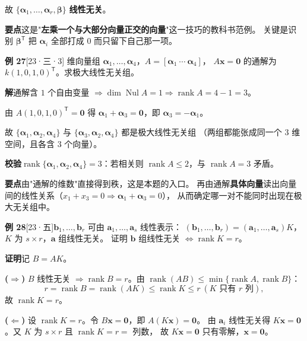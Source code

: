 \documentclass[10pt]{ctexart}
\newcommand{\rank}{\operatorname{rank}}
\newcommand{\Nul}{\operatorname{Nul}}
\newcommand{\TT}{^{\mathsf T}}
\newcommand{\yiii}[1]{\textcolor{y23}{[23·#1]}}
\begin{document}
故 $\{\boldsymbol\alpha_1,\dots,\boldsymbol\alpha_r,\boldsymbol\beta\}$ \textbf{线性无关}。

\begin{tipbox}
\textbf{要点}\quad 这是"\textbf{左乘一个与大部分向量正交的向量}"这一技巧的教科书范例。
关键是识别 $\boldsymbol\beta\TT$ 把 $\boldsymbol\alpha_i$ 全部打成 $0$ 而只留下自己那一项。
\end{tipbox}

\medskip
\textbf{例 27}\yiii{三·3} 维向量组 $\boldsymbol\alpha_1,\dots,\boldsymbol\alpha_4$，$A=[\boldsymbol\alpha_1\ \cdots\ \boldsymbol\alpha_4]$，
$A\mathbf x=\mathbf 0$ 的通解为 $k(1,0,1,0)\TT$。求极大线性无关组。

\textbf{解}\quad 通解含 $1$ 个自由变量 $\Rightarrow\dim\Nul A=1\Rightarrow\rank A=4-1=3$。

由 $A(1,0,1,0)\TT=\mathbf 0$ 得 $\boldsymbol\alpha_1+\boldsymbol\alpha_3=\mathbf 0$，即 $\boldsymbol\alpha_3=-\boldsymbol\alpha_1$。

故 $\{\boldsymbol\alpha_1,\boldsymbol\alpha_2,\boldsymbol\alpha_4\}$ 与 $\{\boldsymbol\alpha_3,\boldsymbol\alpha_2,\boldsymbol\alpha_4\}$ 都是极大线性无关组
（两组都能张成同一个 3 维空间，且各含 3 个向量）。

\textbf{校验}\quad $\rank\{\boldsymbol\alpha_1,\boldsymbol\alpha_2,\boldsymbol\alpha_4\}=3$：若相关则 $\rank A\le2$，与 $\rank A=3$ 矛盾。

\begin{tipbox}
\textbf{要点}\quad 由"通解的维数"直接得到秩，这是本题的入口。
再由通解\textbf{具体向量}读出向量间的线性关系（$x_1+x_3=0\Rightarrow\boldsymbol\alpha_1+\boldsymbol\alpha_3=0$），
从而确定哪一对不能同时出现在极大无关组中。
\end{tipbox}

\medskip
\textbf{例 28}\yiii{五}\quad $\mathbf b_1,\dots,\mathbf b_r$ 可由 $\mathbf a_1,\dots,\mathbf a_s$ 线性表示：
$(\mathbf b_1,\dots,\mathbf b_r)=(\mathbf a_1,\dots,\mathbf a_s)K$，$K$ 为 $s\times r$，$\mathbf a$ 组线性无关。
证明 $\mathbf b$ 组线性无关 $\iff\rank K=r$。

\textbf{证明}\quad 记 $B=AK$。

\textbf{($\Rightarrow$)} $B$ 线性无关 $\Rightarrow\rank B=r$。由 $\rank(AB)\le\min\{\rank A,\rank B\}$：
\[
r=\rank B=\rank(AK)\le\rank K\le r\ (K\text{ 只有 }r\text{ 列}),
\]
故 $\rank K=r$。

\textbf{($\Leftarrow$)} 设 $\rank K=r$。令 $B\mathbf x=\mathbf 0$，即 $A(K\mathbf x)=\mathbf 0$。
由 $\mathbf a_i$ 线性无关得 $K\mathbf x=\mathbf 0$。又 $K$ 为 $s\times r$ 且 $\rank K=r=$ 列数，
故 $K\mathbf x=\mathbf 0$ 只有零解，$\mathbf x=\mathbf 0$。
\end{document}
